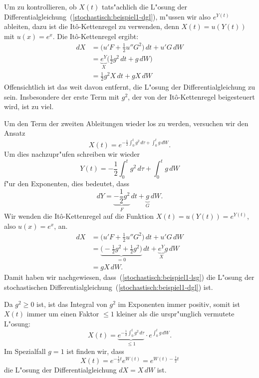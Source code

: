 Um zu kontrollieren, ob $X(t)$ tats"achlich die L"osung der
Differentialgleichung~(\ref{stochastisch:beispiel1-dgl}), m"ussen wir
also $e^{Y(t)}$ ableiten, dazu ist die It\^o-Kettenregel zu verwenden,
denn $X(t)=u(Y(t))$ mit $u(x)=e^x$.
Die It\^o-Kettenregel ergibt:
\begin{align*}
dX
&=
\biggl( u'F+\frac12u''G^2 \biggr)\,dt + u' G\,dW
\\
&=
\underbrace{e^Y}_{\textstyle X}\biggl(\frac12g^2\,dt + g\,dW\biggr)
\\
&=
\frac12g^2X\,dt + gX\,dW
\end{align*}
Offensichtlich ist das weit davon entfernt, die L"osung der
Differentialgleichung zu sein.
Insbesondere der erste Term mit $g^2$, der von der It\^o-Kettenregel
beigesteuert wird, ist zu viel.

Um den Term der zweiten Ableitungen wieder los zu werden, versuchen wir
den Ansatz
\begin{equation}
X(t) = e^{-\frac12\int_0^tg^2\,d\tau+\int_0^t g\,dW}.
\label{stochastisch:beispiel1-lsg}
\end{equation}
Um dies nachzupr"ufen schreiben wir wieder 
\[
Y(t)
=
-\frac12\int_0^tg^2\,d\tau+\int_0^t g\,dW
\]
f"ur den Exponenten, dies bedeutet, dass
\[
dY
=
\underbrace{-\frac12g^2}_{\textstyle F}\,dt
+
\underbrace{g}_{\textstyle G}\,dW.
\]
Wir wenden die It\^o-Kettenregel auf die Funktion
$X(t)=u(Y(t))=e^{Y(t)}$, also $u(x)=e^x$, an.
\begin{align*}
dX
&=
\biggl( u'F + \frac12u''G^2\biggr)\,dt + u'G\,dW
\\
&=
\underbrace{\biggl(-\frac12 g^2 + \frac12 g^2\biggr)}_{\textstyle=0}\,dt
+
\underbrace{e^Y}_{\textstyle X}g\,dW
\\
&=gX\,dW.
\end{align*}
Damit haben wir nachgewiesen, dass~(\ref{stochastisch:beispiel1-lsg})
die L"osung der stochastischen
Differentialgleichung~(\ref{stochastisch:beispiel1-dgl}) ist.

Da $g^2\ge 0$ ist, ist das Integral von $g^2$ im Exponenten
immer positiv, somit ist $X(t)$ immer um einen Faktor $\le1$ 
kleiner als die urspr"unglich vermutete L"osung:
\[
X(t)
=
\underbrace{e^{-\frac12 \int_0^tg^2\,d\tau}}_{\textstyle \le 1}\cdot e^{\int_0^tg\,dW}.
\]
Im Spezialfall $g=1$ ist finden wir, dass
\[
X(t)=e^{-\frac12t}e^{W(t)}=e^{W(t)-\frac12t}
\]
die L"osung der Differentialgleichung $dX=X\,dW$ ist.

